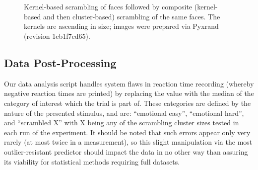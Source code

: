 		\begin{figure}
		    \begin{subfigure}[b]{0.495\textwidth}
			\centering{}
			\label{fig:m_vs_pe_1_a}
		    \end{subfigure}
		    ~%
		    \begin{subfigure}[b]{0.495\textwidth}
			\centering{}
			\label{fig:m_vs_pe_1_b}
		    \end{subfigure}
		    
		    \vspace{0.5cm}%
		    \begin{subfigure}[b]{0.495\textwidth}
			\centering{}
			\label{fig:m_vs_pe_1_c}
		    \end{subfigure}
		    ~%
		    \begin{subfigure}[b]{0.495\textwidth}
			\centering{}
			\label{fig:m_vs_pe_1_d}
		    \end{subfigure}
		    \caption{Kernel-based scrambling of faces followed by composite (kernel-based and then cluster-based) scrambling of the same faces. 
		    The kernels are ascending in size; images were prepared via Pyxrand\citep{pyxrand} (revision \textcolor{lg}{1eb1f7cd65}).}
		    \label{fig:m_vs_pe_1}
		\end{figure}
	\subsection{Data Post-Processing}
	    Our data analysis script handles system flaws in reaction time recording (whereby negative reaction times are printed) by replacing the value with the median of the category of interest which the trial is part of.
	    These categories are defined by the nature of the presented stimulus, and are: “emotional easy”, “emotional hard”, and “scrambled X” with X being any of the scrambling cluster sizes tested in each run of the experiment.
	    It should be noted that such errors appear only very rarely (at most twice in a measurement), so this slight manipulation via the most outlier-resistant predictor should impact the data in no other way than assuring its viability for statistical methods requiring full datasets.  
